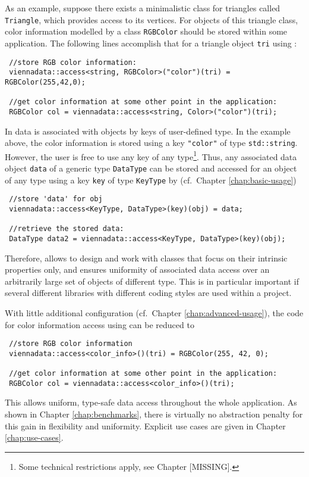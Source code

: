 As an example, suppose there exists a minimalistic class for triangles called \lstinline|Triangle|, 
which provides access to its vertices. For objects of this triangle class, color information modelled by a class \lstinline|RGBColor| should be stored within some application.
The following lines accomplish that for a triangle object \lstinline|tri| using {\ViennaData}:
\begin{lstlisting}
 //store RGB color information:
 viennadata::access<string, RGBColor>("color")(tri) = RGBColor(255,42,0);

 //get color information at some other point in the application:
 RGBColor col = viennadata::access<string, Color>("color")(tri);
\end{lstlisting}
In {\ViennaData} data is associated with objects by keys of user-defined type. In the example above,
the color information is stored using a key \lstinline|"color"| of type \lstinline|std::string|.
However, the user is free to use any key of any type\footnote{Some technical restrictions apply, see Chapter [MISSING].}.
Thus, any associated data object \lstinline|data| of a generic type \lstinline|DataType| can be stored and accessed for an object of any type using a key \lstinline|key| of type \lstinline|KeyType|
by (cf.~Chapter \ref{chap:basic-usage})
\begin{lstlisting}
 //store 'data' for obj
 viennadata::access<KeyType, DataType>(key)(obj) = data;

 //retrieve the stored data:
 DataType data2 = viennadata::access<KeyType, DataType>(key)(obj);
\end{lstlisting}
Therefore, {\ViennaData} allows to design and work with classes that focus on their intrinsic properties only, and 
ensures uniformity of associated data access over an arbitrarily large set of objects of different type.
This is in particular important if several different libraries with different coding styles are used within a project.

With little additional configuration (cf.~Chapter \ref{chap:advanced-usage}), the code for color information access using {\ViennaData} can be reduced to
\begin{lstlisting}
 //store RGB color information
 viennadata::access<color_info>()(tri) = RGBColor(255, 42, 0);

 //get color information at some other point in the application:
 RGBColor col = viennadata::access<color_info>()(tri);
\end{lstlisting}
This allows uniform, type-safe data access throughout the whole application.
As shown in Chapter \ref{chap:benchmarks}, there is virtually no abstraction penalty for this gain in flexibility and uniformity. Explicit use cases are given in Chapter \ref{chap:use-cases}.


